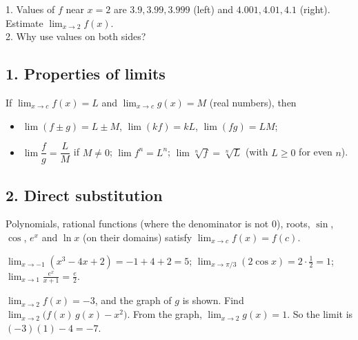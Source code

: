 \begin{quickcheck}
1. Values of $f$ near $x=2$ are $3.9, 3.99, 3.999$ (left) and $4.001, 4.01, 4.1$ (right). Estimate $\lim_{x\to2}f(x)$.\\
2. Why use values on both sides?
\end{quickcheck}


\subsection*{1. Properties of limits}
\begin{keyidea}
If $\lim_{x\to c}f(x)=L$ and $\lim_{x\to c}g(x)=M$ (real numbers), then
\begin{itemize}
\item $\lim(f\pm g)=L\pm M$, \quad $\lim(kf)=kL$, \quad $\lim(fg)=LM$;
\item $\lim\dfrac fg=\dfrac LM$ if $M\neq0$; \quad $\lim f^n=L^n$; \quad $\lim\sqrt[n]{f}=\sqrt[n]{L}$ (with $L\ge0$ for even $n$).
\end{itemize}
\end{keyidea}

\subsection*{2. Direct substitution}
Polynomials, rational functions (where the denominator is not 0), roots, $\sin$, $\cos$, $e^x$ and $\ln x$ (on their domains) satisfy $\lim_{x\to c}f(x)=f(c)$.

\begin{example}[Example 1]
\sol $\displaystyle\lim_{x\to-1}\left(x^3-4x+2\right)=-1+4+2=5$; \quad $\displaystyle\lim_{x\to\pi/3}\left(2\cos x\right)=2\cdot\tfrac12=1$; \quad $\displaystyle\lim_{x\to1}\frac{e^x}{x+1}=\frac e2$.
\end{example}

\begin{example}
\begin{center}
\end{center}
$\lim_{x\to2}f(x)=-3$, and the graph of $g$ is shown. Find $\lim_{x\to2}\big(f(x)\,g(x)-x^2\big)$.
\sol From the graph, $\lim_{x\to2}g(x)=1$. So the limit is $(-3)(1)-4=-7$.
\end{example}


